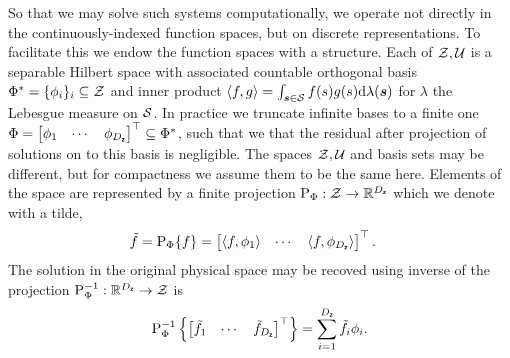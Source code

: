 So that we may solve such systems computationally, we operate not directly in the continuously-indexed function spaces, but on discrete representations.
To facilitate this we endow the function spaces with a structure.
Each of \(\mathcal{Z},\mathcal{U}\) is a separable Hilbert space with associated countable orthogonal basis \(\Phi^*=\{\phi_i\}_i\subseteq\mathcal{Z}\) and inner product \(\langle f,g \rangle=\int_{\boldsymbol{s} \in \mathcal{S}}f(s)g(s)\mathrm{d}\lambda(\boldsymbol{s})\) for \(\lambda\) the Lebesgue measure on \(\mathcal{S}\).
In practice we truncate infinite bases to a finite one \(\Phi=\begin{bmatrix}
    \phi_1 &\cdots &\phi_{D_{\boldsymbol{\mathsf{z}}}}
\end{bmatrix}^{\top}\subseteq\Phi^*\), such that we that the residual after projection of solutions on to this basis is negligible.
The spaces \(\mathcal{Z},\mathcal{U}\) and basis sets may be different, but for compactness we assume them to be the same here.
Elements of the space are represented by a finite projection \(\mathrm{P}_{\Phi}:\mathcal{Z}\to\mathbb{R}^{D_{\boldsymbol{\mathsf{z}}}}\) which we denote with a tilde,
\begin{align*}
    \tilde{f} = \mathrm{P}_{\Phi}\{f\} = \begin{bmatrix}
        \langle f,\phi_1\rangle&\cdots& \langle f,\phi_{D_{\boldsymbol{\mathsf{z}}}}\rangle 
    \end{bmatrix}^{\top}. \quad \textcolor{red}{
    }
\end{align*}
The solution in the original physical space may be recoved using inverse of the projection \(\mathrm{P}_{\Phi}^{-1}:\mathbb{R}^{D_{\boldsymbol{\mathsf{z}}}}\to\mathcal{Z}\) is 
\begin{align*}
    \mathrm{P}_{\Phi}^{-1}\left\{\begin{bmatrix}\tilde{f}_1&\cdots&\tilde{f}_{D_{\boldsymbol{\mathsf{z}}}}\end{bmatrix}^{\top}\right\} = \sum_{i=1}^{D_{\boldsymbol{\mathsf{z}}}} \tilde{f}_i\phi_i.
\end{align*}

